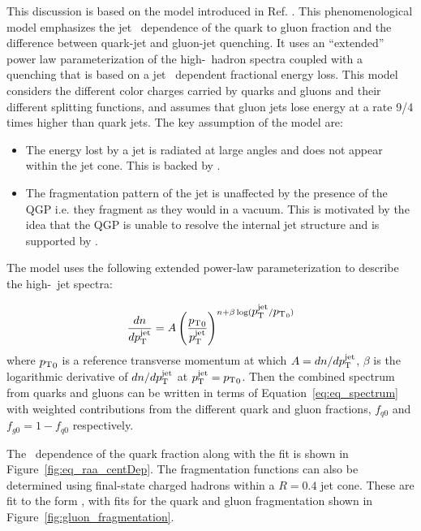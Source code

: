 
This discussion is based on the model introduced in Ref.
\cite{Spousta:2015fca}.
This phenomenological model emphasizes the jet \pt\ dependence of the quark to gluon fraction and the difference between quark-jet and gluon-jet quenching.
It uses an ``extended'' power law parameterization of the high-\pt\ hadron spectra coupled with a quenching that is based on a jet \pt\ dependent fractional energy loss.
This model considers the different color charges carried by quarks and gluons and their different splitting functions, and assumes that gluon jets lose energy at a rate 9/4 times higher than quark jets.
The key assumption of the model are:
\begin{itemize}
\item The energy lost by a jet is radiated at large angles and does not appear within the jet cone.
This is backed by \cite{Chatrchyan:2011sx}.
\item The fragmentation pattern of the jet is unaffected by the presence of the QGP i.e.
they fragment as they would in a vacuum.
This is motivated by the idea that the QGP is unable to resolve the internal jet structure and is supported by \cite{Blaizot:2013hx, CasalderreySolana:2012ef}.
\end{itemize} 

The model uses the following extended power-law parameterization to describe the high-\pt\ jet spectra:

\begin{align}
\frac{dn}{d\mbox{$p_{\mathrm{T}}^{\mathrm{jet}}$}} = A \left( \frac{\mbox{$p_{\mathrm{T}}$}_0}{\mbox{$p_{\mathrm{T}}^{\mathrm{jet}}$}} \right) ^{n+\beta \log(\mbox{$p_{\mathrm{T}}^{\mathrm{jet}}$} / \mbox{$p_{\mathrm{T}}$}_0)}
\label{eq:eq_spectrum}
\end{align}
where $\mbox{$p_{\mathrm{T}}$}_0$ is a reference transverse momentum at which $A= dn/d\mbox{$p_{\mathrm{T}}^{\mathrm{jet}}$}$, $\beta$ is the logarithmic derivative of $dn/d\mbox{$p_{\mathrm{T}}^{\mathrm{jet}}$}$ at $\mbox{$p_{\mathrm{T}}^{\mathrm{jet}}$} = \mbox{$p_{\mathrm{T}}$}_0$.
Then the combined spectrum from quarks and gluons can be written in terms of Equation~\ref{eq:eq_spectrum} with weighted contributions from the different quark and gluon fractions, $f_{q0}$ and $f_{g0} = 1-f_{q0}$ respectively.

The \pt\ dependence of the quark fraction along with the fit is shown in Figure~\ref{fig:eq_raa_centDep}.
The fragmentation functions can also be determined using final-state charged hadrons within a $R=0.4$ jet cone.
These are fit to the form \Dz, with fits for the quark and gluon fragmentation shown in Figure~\ref{fig:gluon_fragmentation}.


